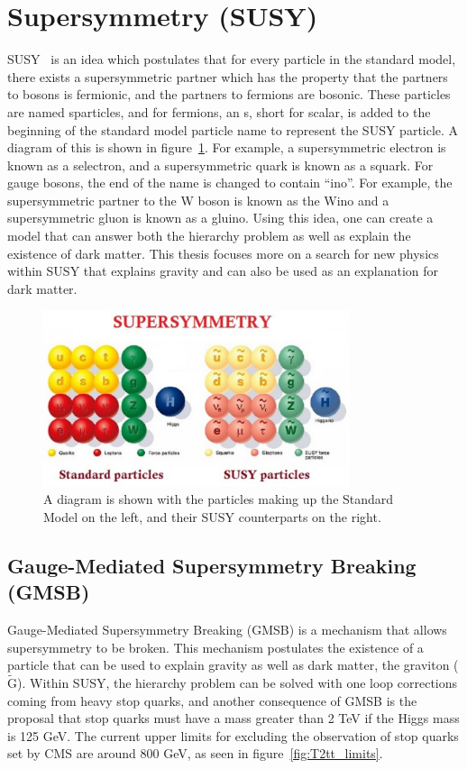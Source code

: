 \section{Supersymmetry (SUSY)}
SUSY~\cite{SUSYPrimer} is an idea which postulates that for every particle in the standard model,
there exists a supersymmetric partner which has the property that the partners to bosons is fermionic, and the partners to fermions are bosonic.
These particles are named sparticles, and for fermions, an s, short for scalar, is added to the beginning of the standard model particle name to represent the SUSY particle.
A diagram of this is shown in figure~\ref{fig:SM_SUSY}.
For example, a supersymmetric electron is known as a selectron, and a supersymmetric quark is known as a squark.
For gauge bosons, the end of the name is changed to contain ``ino''.
For example, the supersymmetric partner to the W boson is known as the Wino and a supersymmetric gluon is known as a gluino.
Using this idea, one can create a model that can answer both the hierarchy problem as well as explain the existence of dark matter.
This thesis focuses more on a search for new physics within SUSY that explains gravity and can also be used as an explanation for dark matter.

\begin{figure}[!htb]
  \begin{center}
    \includegraphics[width=0.8\textwidth]{intro/figs/Susy-particles.pdf}
    \caption{
      \label{fig:SM_SUSY}
      A diagram is shown with the particles making up the Standard Model on the left, and their SUSY counterparts on the right.
    }
  \end{center}
\end{figure}

\subsection{Gauge-Mediated Supersymmetry Breaking (GMSB)}
Gauge-Mediated Supersymmetry Breaking (GMSB) is a mechanism that allows supersymmetry to be broken.
This mechanism postulates the existence of a particle that can be used to explain gravity as well as dark matter, the graviton ($\mathrm{\tilde{G}}$).
Within SUSY, the hierarchy problem can be solved with one loop corrections coming from heavy stop quarks,
and another consequence of GMSB is the proposal that stop quarks must have a mass greater than 2 TeV if the Higgs mass is 125 GeV.
The current upper limits for excluding the observation of stop quarks set by CMS are around 800 GeV, as seen in figure~\ref{fig:T2tt_limits}.

